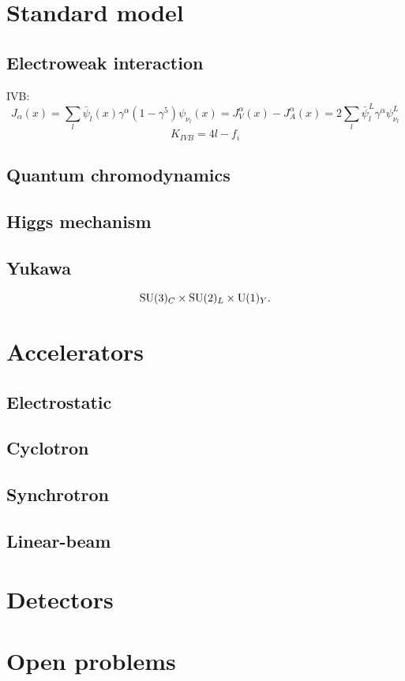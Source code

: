 \chapter{Standard model}

\section{Electroweak interaction}
IVB:
\[ J_\alpha(x) = \sum_l \bar{\psi}_l(x)\gamma^\alpha(1-\gamma^5)\psi_{\nu_l}(x) = J_V^\alpha(x) - J_A^\alpha(x) = 2\sum_l\bar{\psi}^L_l\gamma^\alpha\psi^L_{\nu_l} \]
\[ K_{IVB} = 4l - f_i \]

\section{Quantum chromodynamics}

\section{Higgs mechanism}

\section{Yukawa}

\[\operatorname{SU}(3)_C\times \operatorname{SU}(2)_L \times \operatorname{U}(1)_Y.\]

\chapter{Accelerators}
\section{Electrostatic}
\section{Cyclotron}
\section{Synchrotron}
\section{Linear-beam}

\chapter{Detectors}

\chapter{Open problems}